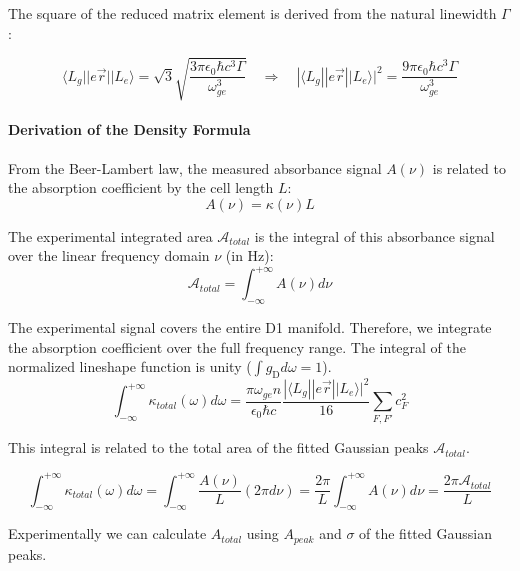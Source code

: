 The square of the reduced matrix element is derived from the natural linewidth $\Gamma$ \cite{Steck_Quantum_Optics}:

\begin{equation}
    \langle L_g || e\vec{r} || L_e \rangle = \sqrt{3} \sqrt{\frac{3 \pi \epsilon_0 \hbar c^3 \Gamma}{\omega_{ge}^3}} \quad \Rightarrow \quad |\langle L_g || e\vec{r} || L_e \rangle|^2 = \frac{9 \pi \epsilon_0 \hbar c^3 \Gamma}{\omega_{ge}^3}
    \label{eq:reduced_matrix_element}
\end{equation}

\paragraph{Derivation of the Density Formula}


From the Beer-Lambert law, the measured absorbance signal $A(\nu)$ is related to the absorption coefficient by the cell length $L$:
\begin{equation}
    A(\nu) = \kappa(\nu) L 
\end{equation}

The experimental integrated area $\mathcal{A}_{total}$ is the integral of this absorbance signal over the linear frequency domain $\nu$ (in Hz):
\begin{equation}
    \mathcal{A}_{total} = \int_{-\infty}^{+\infty} A(\nu) d\nu
\end{equation}


The experimental signal covers the entire D1 manifold. Therefore, we integrate the absorption coefficient over the full frequency range. The integral of the normalized lineshape function is unity ($\int g_{\text{D}} d\omega = 1$).
\begin{equation}
    \int_{-\infty}^{+\infty} \kappa_{total}(\omega) d\omega = \frac{\pi \omega_{ge} n}{\epsilon_0 \hbar c} \frac{|\langle L_g || e\vec{r} || L_e \rangle|^2}{16} \sum_{F,F'} c_F^2
\end{equation}

This integral is related to the total area of the fitted Gaussian peaks $\mathcal{A}_{total}$. 


\begin{equation}
    \int_{-\infty}^{+\infty} \kappa_{total}(\omega) d\omega = \int_{-\infty}^{+\infty} \frac{A(\nu)}{L} (2\pi d\nu) = \frac{2\pi}{L} \int_{-\infty}^{+\infty} A(\nu) d\nu = \frac{2\pi \mathcal{A}_{total}}{L}
\end{equation}

Experimentally we can calculate ${A}_{total}$ using ${A}_{peak}$ and $\sigma$ of the fitted Gaussian peaks.

